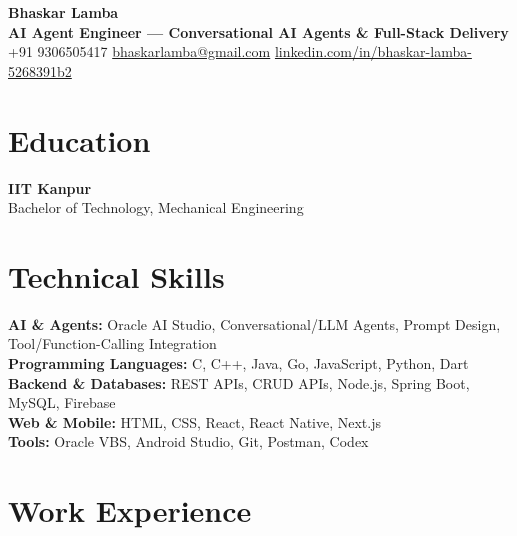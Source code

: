 \documentclass[10pt,a4paper]{article}
\newcommand{\skillCategory}[2]{\textbf{#1:} #2}
\begin{document}
\begin{center}
    {\LARGE\bfseries Bhaskar Lamba}\\[4pt]
    {\small\color{primary}\bfseries AI Agent Engineer --- Conversational AI Agents \& Full-Stack Delivery}\\[3pt]
    \small
    +91 9306505417 \quad\textbar\quad
    \href{mailto:bhaskarlamba@gmail.com}{bhaskarlamba@gmail.com} \quad\textbar\quad
    \href{https://www.linkedin.com/in/bhaskar-lamba-5268391b2/}{linkedin.com/in/bhaskar-lamba-5268391b2}
\end{center}
\vspace{6pt}

\section{Education}
\small
\textbf{IIT Kanpur} \hfill {}\\
Bachelor of Technology, Mechanical Engineering

\section{Technical Skills}
\small
\skillCategory{AI \& Agents}{Oracle AI Studio, Conversational/LLM Agents, Prompt Design, Tool/Function-Calling Integration}\\[1pt]
\skillCategory{Programming Languages}{C, C++, Java, Go, JavaScript, Python, Dart}\\[1pt]
\skillCategory{Backend \& Databases}{REST APIs, CRUD APIs, Node.js, Spring Boot, MySQL, Firebase}\\[1pt]
\skillCategory{Web \& Mobile}{HTML, CSS, React, React Native, Next.js}\\[1pt]
\skillCategory{Tools}{Oracle VBS, Android Studio, Git, Postman, Codex}

\section{Work Experience}
\small
\end{document}
